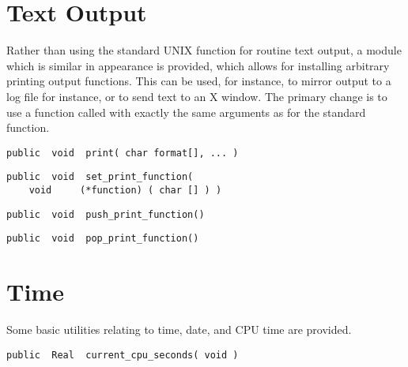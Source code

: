 
\section{Text Output}

Rather than using the standard UNIX function  for routine
text output, a module which is similar in appearance is provided,
which allows for installing arbitrary printing output functions.  This
can be used, for instance, to mirror output to a log file for
instance, or to send text to an X window.  The primary change is to
use a function called  with exactly the same arguments as
for the standard  function.

{\bf\begin{verbatim}
public  void  print( char format[], ... )
\end{verbatim}}


{\bf\begin{verbatim}
public  void  set_print_function(
    void     (*function) ( char [] ) )
\end{verbatim}}


{\bf\begin{verbatim}
public  void  push_print_function()
\end{verbatim}}


{\bf\begin{verbatim}
public  void  pop_print_function()
\end{verbatim}}


\section{Time}

Some basic utilities relating to time, date, and CPU time are
provided.

{\bf\begin{verbatim}
public  Real  current_cpu_seconds( void )
\end{verbatim}}


